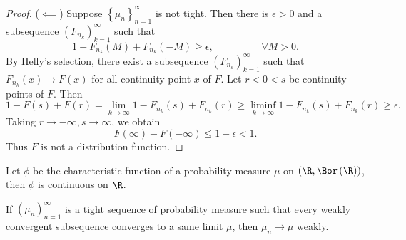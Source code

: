 \documentclass[stat901]{subfiles}
\begin{document}
\begin{proof}
        ($\impliedby$) Suppose $\left\lbrace \mu_n \right\rbrace^{\infty}_{n=1}$ is not tight. Then there is $\epsilon>0$ and a subsequence $\left( F_{n_k} \right)^{\infty}_{k=1}$ such that
        \begin{equation*}
            1-F_{n_k}\left( M \right)+F_{n_k}\left( -M \right)\geq \epsilon, \hspace{2cm}\forall M>0.
        \end{equation*}
        By Helly's selection, there exist a subsequence $\left( F_{n_k} \right)^{\infty}_{k=1}$ such that $F_{n_k}\left( x \right)\to F\left( x \right)$ for all continuity point $x$ of $F$. Let $r<0<s$ be continuity points of $F$. Then
        \begin{equation*}
            1-F\left( s \right)+F\left( r \right) = \lim_{k\to\infty} 1-F_{n_k}\left( s \right)+F_{n_k}\left( r \right) \geq \liminf_{k\to\infty} 1-F_{n_k}\left( s \right)+F_{n_k}\left( r \right) \geq \epsilon.
        \end{equation*}
        Taking $r\to-\infty,s\to\infty$, we obtain
        \begin{equation*}
            F\left( \infty \right)-F\left( -\infty \right) \leq 1-\epsilon < 1.
        \end{equation*}
        Thus $F$ is not a distribution function.
    \end{proof}

    \begin{prop}{}
        Let $\phi$ be the characteristic function of a probability measure $\mu$ on $\left( \R,\Bor\left( \R \right) \right)$, then $\phi$ is continuous on $\R$.
    \end{prop}
    
    \rruleline

    \begin{prop}{}
        If $\left( \mu_{n} \right)^{\infty}_{n=1}$ is a tight sequence of probability measure such that every weakly convergent subsequence converges to a same limit $\mu$, then $\mu_n\to\mu$ weakly.
    \end{prop}
\end{document}
